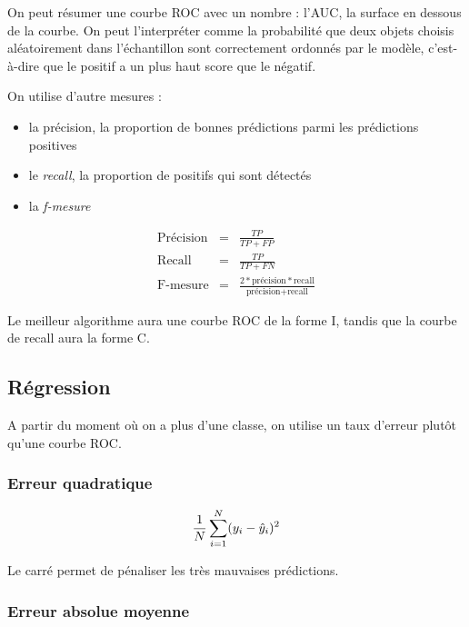 	
	On peut résumer une courbe ROC avec un nombre : l'AUC, la surface en dessous de la courbe. On peut l'interpréter comme la probabilité que deux objets choisis aléatoirement dans l'échantillon sont correctement ordonnés par le modèle, c'est-à-dire que le positif a un plus haut score que le négatif.
	
	On utilise d'autre mesures :
	
	\begin{itemize}
		\item la précision, la proportion de bonnes prédictions parmi les prédictions positives
		\item le \textit{recall}, la proportion de positifs qui sont détectés
		\item la \textit{f-mesure}
	\end{itemize}
	
	\begin{eqnarray*}
	\text{Précision} & = & \frac{TP}{TP + FP} \\
	\text{Recall} & = & \frac{TP}{TP + FN} \\
	\text{F-mesure} & = & \frac{2 * \text{précision} * \text{recall}}{\text{précision} + \text{recall}}
	\end{eqnarray*}
	
	
	Le meilleur algorithme aura une courbe ROC de la forme {\pigpenfont I}, tandis que la courbe de recall aura la forme {\pigpenfont C}.
	
	\subsection{Régression}
	
		A partir du moment où on a plus d'une classe, on utilise un taux d'erreur plutôt qu'une courbe ROC.
	
		\subsubsection{Erreur quadratique}
		
		$$\frac{1}{N} \sum_{i = 1}^N (y_i - \hat{y}_i)^2$$
		
		Le carré permet de pénaliser les très mauvaises prédictions.
		
		\subsubsection{Erreur absolue moyenne}
		
